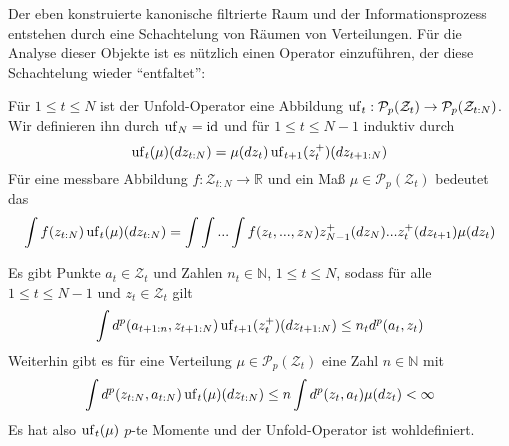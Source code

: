 Der eben konstruierte kanonische filtrierte Raum und der Informationsprozess entstehen durch eine Schachtelung von Räumen von Verteilungen. Für die Analyse dieser Objekte ist es nützlich einen Operator einzuführen, der diese Schachtelung wieder ``entfaltet'':
\begin{definition}
Für $1\leq t\leq N$ ist der Unfold-Operator eine Abbildung $\operatorname{uf}_t:\mathcal{P}_p(\mathcal{Z}_t) \rightarrow \mathcal{P}_p(\mathcal{Z}_{t:N})$. Wir definieren ihn durch $\operatorname{uf}_N=\operatorname{id}$ und für $1\leq t\leq N-1$ induktiv durch
$$\operatorname{uf}_{t}(\mu)(dz_{t:N})=\mu(dz_t)\operatorname{uf}_{t+1}(z_t^+)(dz_{t+1:N})$$
Für eine messbare Abbildung $f:\mathcal{Z}_{t:N}\rightarrow \mathbb{R}$ und ein Maß $\mu\in\mathcal{P}_p(\mathcal{Z}_t)$ bedeutet das
$$\int f(z_{t:N}) \operatorname{uf}_t(\mu)(dz_{t:N}) = \int\int ...\int f(z_t,...,z_N)z^+_{N-1}(dz_N)...z_{t}^+(dz_{t+1})\mu(dz_t)$$
\end{definition}
\begin{lemma}\label{thm:bounded_unfold}
    Es gibt Punkte $a_t \in \mathcal{Z}_t$ und Zahlen $n_t \in \mathbb{N}$, $1\leq t\leq N$, sodass für alle $1\leq t\leq N-1$ und $z_t \in \mathcal{Z}_t$ gilt
    $$\int d^p(a_{t+1:n}, z_{t+1:N}) \operatorname{uf}_{t+1}(z_t^+)(dz_{t+1:N})\leq n_td^p(a_t, z_t)$$
    Weiterhin gibt es für eine Verteilung $\mu \in \mathcal{P}_p(\mathcal{Z}_t)$ eine Zahl $n\in \mathbb{N}$ mit
    $$\int d^p(z_{t:N}, a_{t:N})\operatorname{uf}_t(\mu)(dz_{t:N})\leq n\int d^p(z_t, a_t)\mu(dz_t)< \infty$$ 
    Es hat also $\operatorname{uf}_t(\mu)$ $p$-te Momente und der Unfold-Operator ist wohldefiniert.
\end{lemma}
